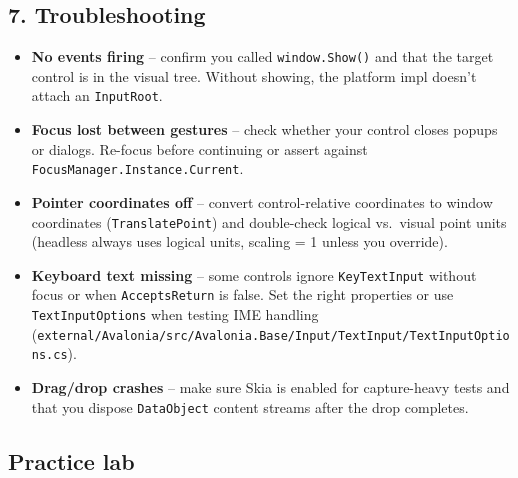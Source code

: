 \subsection{7. Troubleshooting}\label{troubleshooting-5}

\begin{itemize}
\tightlist
\item
  \textbf{No events firing} -- confirm you called
  \passthrough{\lstinline!window.Show()!} and that the target control is
  in the visual tree. Without showing, the platform impl doesn't attach
  an \passthrough{\lstinline!InputRoot!}.
\item
  \textbf{Focus lost between gestures} -- check whether your control
  closes popups or dialogs. Re-focus before continuing or assert against
  \passthrough{\lstinline!FocusManager.Instance.Current!}.
\item
  \textbf{Pointer coordinates off} -- convert control-relative
  coordinates to window coordinates
  (\passthrough{\lstinline!TranslatePoint!}) and double-check logical
  vs.~visual point units (headless always uses logical units, scaling =
  1 unless you override).
\item
  \textbf{Keyboard text missing} -- some controls ignore
  \passthrough{\lstinline!KeyTextInput!} without focus or when
  \passthrough{\lstinline!AcceptsReturn!} is false. Set the right
  properties or use \passthrough{\lstinline!TextInputOptions!} when
  testing IME handling
  (\passthrough{\lstinline!external/Avalonia/src/Avalonia.Base/Input/TextInput/TextInputOptions.cs!}).
\item
  \textbf{Drag/drop crashes} -- make sure Skia is enabled for
  capture-heavy tests and that you dispose
  \passthrough{\lstinline!DataObject!} content streams after the drop
  completes.
\end{itemize}

\subsection{Practice lab}\label{practice-lab-8}

